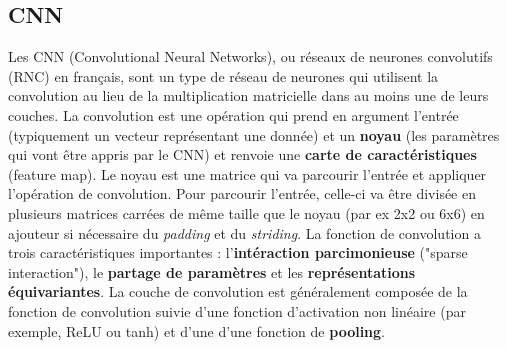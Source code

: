\documentclass[11pt]{article}
\begin{document}
\subsection{CNN}
\label{sec:org55300c2}
Les CNN (Convolutional Neural Networks), ou réseaux de neurones convolutifs (RNC) en français, sont un type de réseau de neurones qui utilisent la convolution au lieu de la multiplication matricielle dans au moins une de leurs couches.
La convolution est une opération qui prend en argument l'entrée (typiquement un vecteur représentant une donnée) et un \textbf{noyau} (les paramètres qui vont être appris par le CNN) et renvoie une \textbf{carte de caractéristiques} (feature map).
Le noyau est une matrice qui va parcourir l'entrée et appliquer l'opération de convolution. 
Pour parcourir l'entrée, celle-ci va être divisée en plusieurs matrices carrées de même taille que le noyau (par ex 2x2 ou 6x6) en ajouteur si nécessaire du \emph{padding} et du \emph{striding}.
La fonction de convolution a trois caractéristiques importantes : l'\textbf{intéraction parcimonieuse} ("sparse interaction"), le \textbf{partage de paramètres} et les \textbf{représentations équivariantes}.
La couche de convolution est généralement composée de la fonction de convolution suivie d'une fonction d'activation non linéaire (par exemple, ReLU ou tanh) et d'une d'une fonction de \textbf{pooling}.
\end{document}
